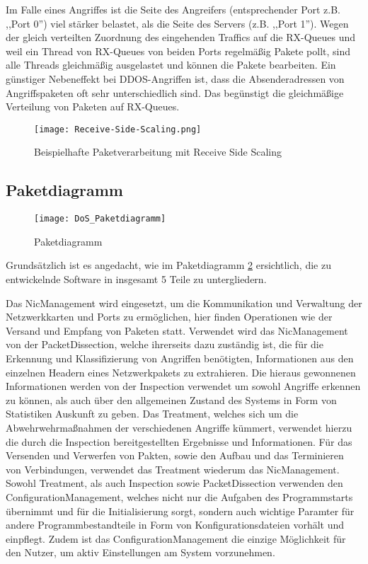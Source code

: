 \documentclass[../review_1.tex]{subfiles}
\begin{document}
Im Falle eines Angriffes ist die Seite des Angreifers (entsprechender Port z.B. ,,Port 0'') viel stärker belastet, als die Seite des Servers (z.B. ,,Port 1''). Wegen der gleich verteilten Zuordnung des eingehenden Traffics auf die RX-Queues und weil ein Thread von RX-Queues von beiden Ports regelmäßig Pakete pollt, sind alle Threads gleichmäßig ausgelastet und können die Pakete bearbeiten. Ein günstiger Nebeneffekt bei DDOS-Angriffen ist, dass die Absenderadressen von Angriffspaketen oft sehr unterschiedlich sind. Das begünstigt die gleichmäßige Verteilung von Paketen auf RX-Queues.

\begin{figure}[t]
    \centering
    \texttt{[image: Receive-Side-Scaling.png]}
    \caption{Beispielhafte Paketverarbeitung mit Receive Side Scaling}
    \label{fig:Receive-Side-Scaling}
\end{figure}

\subsection{Paketdiagramm}
\begin{figure}[t]
    \centering
    \texttt{[image: DoS\_Paketdiagramm]}
    \caption{Paketdiagramm}
    \label{fig:dospaketdiagramm}
\end{figure}
Grundsätzlich ist es angedacht, wie im Paketdiagramm \ref{fig:dospaketdiagramm} ersichtlich, die zu entwickelnde Software in insgesamt 5 Teile zu untergliedern.

Das NicManagement wird eingesetzt, um die Kommunikation und Verwaltung der Netzwerkkarten und Ports zu ermöglichen, hier finden Operationen wie der Versand und Empfang von Paketen statt. Verwendet wird das NicManagement von der PacketDissection, welche ihrerseits dazu zuständig ist, die für die Erkennung und Klassifizierung von Angriffen benötigten, Informationen aus den einzelnen Headern eines Netzwerkpakets zu extrahieren. Die hieraus gewonnenen Informationen werden von der Inspection verwendet um sowohl Angriffe erkennen zu können, als auch über den allgemeinen Zustand des Systems in Form von Statistiken Auskunft zu geben. Das Treatment, welches sich um die Abwehrwehrmaßnahmen der verschiedenen Angriffe kümmert, verwendet hierzu die durch die Inspection bereitgestellten Ergebnisse und Informationen. Für das Versenden und Verwerfen von Pakten, sowie den Aufbau und das Terminieren von Verbindungen, verwendet das Treatment wiederum das NicManagement. Sowohl Treatment, als auch Inspection sowie PacketDissection verwenden den ConfigurationManagement, welches nicht nur die Aufgaben des Programmstarts übernimmt und für die Initialisierung sorgt, sondern auch wichtige Paramter für andere Programmbestandteile in Form von Konfigurationsdateien vorhält und einpflegt. Zudem ist das ConfigurationManagement die einzige Möglichkeit für den Nutzer, um aktiv Einstellungen am System vorzunehmen.
\end{document}
